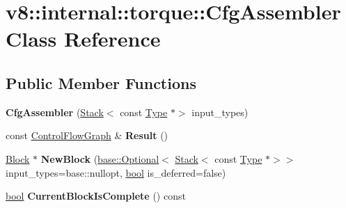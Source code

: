 \hypertarget{classv8_1_1internal_1_1torque_1_1CfgAssembler}{}\section{v8\+:\+:internal\+:\+:torque\+:\+:Cfg\+Assembler Class Reference}
\label{classv8_1_1internal_1_1torque_1_1CfgAssembler}
\subsection*{Public Member Functions}
\begin{DoxyCompactItemize}
\item 
\mbox{\label{classv8_1_1internal_1_1torque_1_1CfgAssembler_a2213f1939c471d4e115ea40252cc0f63}} 
{\bfseries Cfg\+Assembler} (\mbox{\hyperlink{classv8_1_1internal_1_1torque_1_1Stack}{Stack}}$<$ const \mbox{\hyperlink{classv8_1_1internal_1_1torque_1_1Type}{Type}} $\ast$$>$ input\+\_\+types)
\item 
\mbox{\label{classv8_1_1internal_1_1torque_1_1CfgAssembler_a2fdc64a1f4c78669050f70dd2e227698}} 
const \mbox{\hyperlink{classv8_1_1internal_1_1torque_1_1ControlFlowGraph}{Control\+Flow\+Graph}} \& {\bfseries Result} ()
\item 
\mbox{\label{classv8_1_1internal_1_1torque_1_1CfgAssembler_a40224c174cd6f10f2411ec204edfe84e}} 
\mbox{\hyperlink{classv8_1_1internal_1_1torque_1_1Block}{Block}} $\ast$ {\bfseries New\+Block} (\mbox{\hyperlink{classv8_1_1base_1_1Optional}{base\+::\+Optional}}$<$ \mbox{\hyperlink{classv8_1_1internal_1_1torque_1_1Stack}{Stack}}$<$ const \mbox{\hyperlink{classv8_1_1internal_1_1torque_1_1Type}{Type}} $\ast$$>$$>$ input\+\_\+types=base\+::nullopt, \mbox{\hyperlink{classbool}{bool}} is\+\_\+deferred=false)
\item 
\mbox{\label{classv8_1_1internal_1_1torque_1_1CfgAssembler_aafcf3b5fc355c7990e16f6575cba7bef}} 
\mbox{\hyperlink{classbool}{bool}} {\bfseries Current\+Block\+Is\+Complete} () const
\item 
\mbox{\label{classv8_1_1internal_1_1torque_1_1CfgAssembler_ab7bf8b47b060bb82b55256d5578dad1a}} 
$$
\end{DoxyCompactItemize}
